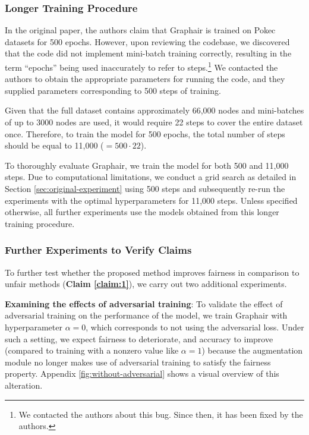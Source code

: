 \subsubsection{Longer Training Procedure}
In the original paper, the authors claim that Graphair is trained on Pokec datasets for 500 epochs. 
However, upon reviewing the codebase, we discovered that the code did not implement mini-batch training correctly,  resulting in the term ``epochs'' being used inaccurately to refer to steps.\footnote{We contacted the authors about this bug. Since then, it has been fixed by the authors.} 
We contacted the authors to obtain the appropriate parameters for running the code, and they supplied parameters corresponding to 500 steps of training.

Given that the full dataset contains approximately 66,000 nodes and mini-batches of up to 3000 nodes are used, it would require 22 steps to cover the entire dataset once. 
Therefore, to train the model for 500 epochs, the total number of steps should be equal to 11,000 ($=500\cdot22$).

To thoroughly evaluate Graphair, we train the model for both 500 and 11,000 steps. 
Due to computational limitations, we conduct a grid search as detailed in Section \ref{sec:original-experiment} using 500 steps and subsequently re-run the experiments with the optimal hyperparameters for 11,000 steps. 
Unless specified otherwise, all further experiments use the models obtained from this longer training procedure.


\subsubsection{Further Experiments to Verify Claims}\label{further_experiments}

To further test whether the proposed method improves fairness in comparison to unfair methods (\textbf{Claim \ref{claim:1}}), we carry out two additional experiments.

\textbf{Examining the effects of adversarial training}:
To validate the effect of adversarial training on the performance of the model, we train Graphair with hyperparameter $\alpha=0$, which corresponds to not using the adversarial loss. 
Under such a setting, we expect fairness to deteriorate, and accuracy to improve (compared to training with a nonzero value like $\alpha=1$) because the augmentation module no longer makes use of adversarial training to satisfy the fairness property. Appendix \ref{fig:without-adversarial} shows a visual overview of this alteration.

